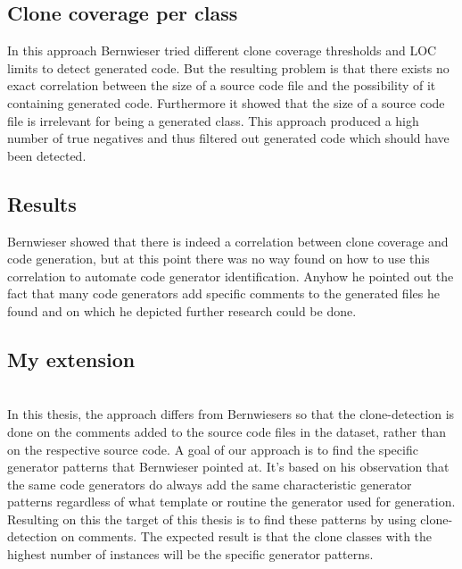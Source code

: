 \subsection{Clone coverage per class}
In this approach Bernwieser tried different clone coverage thresholds and LOC limits to detect generated code. But the resulting problem is that there exists no exact correlation between the size of a source code file and the possibility of it containing generated code. Furthermore it showed that the size of a source code file is irrelevant for being a generated class. This approach produced a high number of true negatives and thus filtered out generated code which should have been detected.

\subsection{Results}
Bernwieser showed that there is indeed a correlation between clone coverage and code generation, but at this point there was no way found on how to use this correlation to automate code generator identification. Anyhow he pointed out the fact that many code generators add specific comments to the generated files he found and on which he depicted further research could be done.

\subsection{My extension}
\\
In this thesis, the approach differs from Bernwiesers so that the clone-detection is done on the comments added to the source code files in the dataset, rather than on the respective source code. A goal of our approach is to find the specific generator patterns that Bernwieser pointed at. It's based on his observation that the same code generators do always add the same characteristic generator patterns regardless of what template or routine the generator used for generation. Resulting on this the target of this thesis is to find these patterns by using clone-detection on comments. The expected result is that the clone classes with the highest number of instances will be the specific generator patterns.

